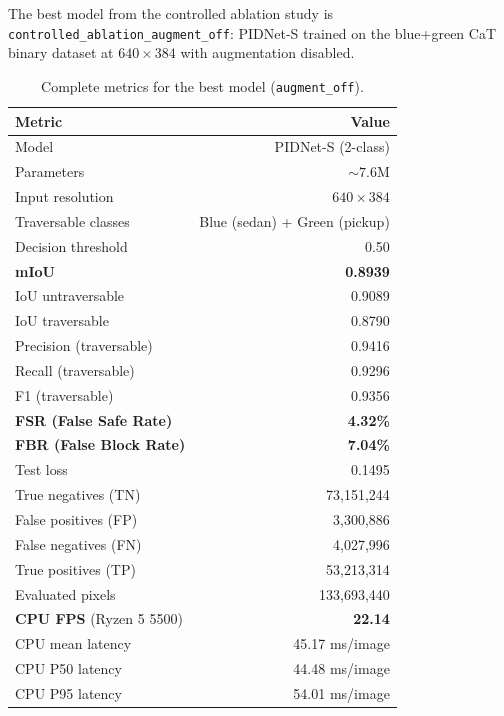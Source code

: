 \documentclass[12pt,a4paper]{report}
\begin{document}
The best model from the controlled ablation study is \texttt{controlled\_ablation\_augment\_off}: PIDNet-S trained on the blue+green CaT binary dataset at $640\times384$ with augmentation disabled.

\begin{table}[H]
\centering
\caption{Complete metrics for the best model (\texttt{augment\_off}).}
\label{tab:best_model}
\begin{tabular}{@{}lr@{}}
\toprule
\textbf{Metric} & \textbf{Value} \\
\midrule
Model                         & PIDNet-S (2-class) \\
Parameters                    & ${\sim}7.6$M \\
Input resolution              & $640 \times 384$ \\
Traversable classes           & Blue (sedan) + Green (pickup) \\
Decision threshold            & 0.50 \\
\midrule
\textbf{mIoU}                 & \textbf{0.8939} \\
IoU untraversable             & 0.9089 \\
IoU traversable               & 0.8790 \\
Precision (traversable)       & 0.9416 \\
Recall (traversable)          & 0.9296 \\
F1 (traversable)              & 0.9356 \\
\textbf{FSR (False Safe Rate)}& \textbf{4.32\%} \\
\textbf{FBR (False Block Rate)}& \textbf{7.04\%} \\
Test loss                     & 0.1495 \\
\midrule
True negatives (TN)           & 73{,}151{,}244 \\
False positives (FP)          & 3{,}300{,}886 \\
False negatives (FN)          & 4{,}027{,}996 \\
True positives (TP)           & 53{,}213{,}314 \\
Evaluated pixels              & 133{,}693{,}440 \\
\midrule
\textbf{CPU FPS} (Ryzen 5 5500) & \textbf{22.14} \\
CPU mean latency              & 45.17 ms/image \\
CPU P50 latency               & 44.48 ms/image \\
CPU P95 latency               & 54.01 ms/image \\
\bottomrule
\end{tabular}
\end{table}
\end{document}
